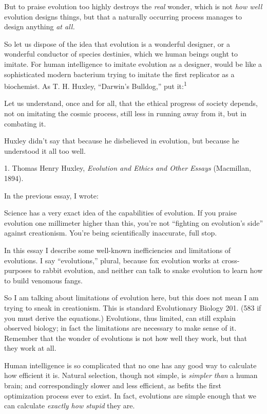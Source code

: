 {
 But to praise evolution too highly destroys the \textit{real}
wonder, which is not \textit{how well} evolution designs things, but
that a naturally occurring process manages to design anything
\textit{at all.}}

{
 So let us dispose of the idea that evolution is a wonderful
designer, or a wonderful conductor of species destinies, which we human
beings ought to imitate. For human intelligence to imitate evolution as
a designer, would be like a sophisticated modern bacterium trying to
imitate the first replicator as a biochemist. As T. H. Huxley,
``Darwin's
Bulldog,'' put it:\textsuperscript{1}}

{
 Let us understand, once and for all, that the ethical progress of
society depends, not on imitating the cosmic process, still less in
running away from it, but in combating it.}

{
 Huxley didn't say that because he disbelieved in
evolution, but because he understood it all too well.}

\myendsectiontext


\bigskip

{
 1. Thomas Henry Huxley, \textit{Evolution and Ethics and Other
Essays} (Macmillan, 1894).}


{
 In the previous essay, I wrote:}

{
 Science has a very exact idea of the capabilities of evolution. If
you praise evolution one millimeter higher than this,
you're not ``fighting on
evolution's side'' against
creationism. You're being scientifically inaccurate,
full stop.}

{
 In this essay I describe some well-known inefficiencies and
limitations of evolutions. I say
``evolutions,'' plural, because fox
evolution works at cross-purposes to rabbit evolution, and neither can
talk to snake evolution to learn how to build venomous fangs.}

{
 So I am talking about limitations of evolution here, but this does
not mean I am trying to sneak in creationism. This is standard
Evolutionary Biology 201. (583 if you must derive the equations.)
Evolutions, thus limited, can still explain observed biology; in fact
the limitations are necessary to make sense of it. Remember that the
wonder of evolutions is not how well they work, but that they work at
all.}

{
 Human intelligence is so complicated that no one has any good way
to calculate how efficient it is. Natural selection, though not simple,
is \textit{simpler than} a human brain; and correspondingly slower and
less efficient, as befits the first optimization process ever to exist.
In fact, evolutions are simple enough that we can calculate
\textit{exactly how stupid} they are.}

